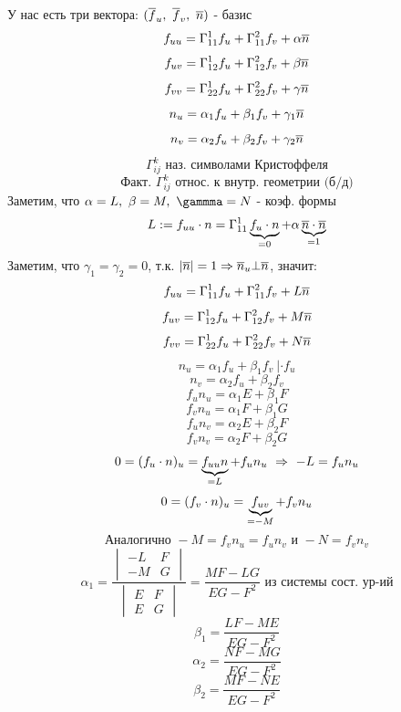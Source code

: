 \documentclass[main]{subfiles}
\begin{document}
    У нас есть три вектора: $(\ol{f}_u,\ \ol{f}_v,\ \ol{n})$ - базис
    \[f_{uu} = \Gamma_{11}^1 f_u + \Gamma_{11}^2 f_v + \alpha \ol{n}\]
    \[f_{uv} = \Gamma_{12}^1 f_u + \Gamma_{12}^2 f_v + \beta \ol{n}\]
    \[f_{vv} = \Gamma_{22}^1 f_u + \Gamma_{22}^2 f_v + \gamma \ol{n}\]
    \[n_u = \alpha_1 f_u + \beta_1 f_v + \gamma_1 \ol{n}\]
    \[n_v = \alpha_2 f_u + \beta_2 f_v + \gamma_2 \ol{n}\]
    \[\Gamma_{ij}^k \text{ наз. символами Кристоффеля}\]
    \[\text{Факт. } \Gamma_{ij}^k \text{ относ. к внутр. геометрии (б/д)}\]
    Заметим, что $\alpha = L,\ \beta = M,\ \gammma = N$ - коэф.  формы
    \[L := f_{uu} \cdot n = \Gamma_{11}^1 \ub{=0}{f_u \cdot n} + \alpha \ub{=1}{\ol{n} \cdot \ol{n}}\]
    Заметим, что $\gamma_1 = \gamma_2 = 0$, т.к. $|\ol{n}| = 1 \Ra \ol{n}_u \bot \ol{n}$, значит:
    \[f_{uu} = \Gamma_{11}^1 f_u + \Gamma_{11}^2 f_v + L \ol{n}\]
    \[f_{uv} = \Gamma_{12}^1 f_u + \Gamma_{12}^2 f_v + M \ol{n}\]
    \[f_{vv} = \Gamma_{22}^1 f_u + \Gamma_{22}^2 f_v + N \ol{n}\]
    \[n_u = \alpha_1 f_u + \beta_1 f_v \ |\cdot f_u\]
    \[n_v = \alpha_2 f_u + \beta_2 f_v \]
    \[f_u n_u = \alpha_1 E + \beta_1 F\]
    \[f_v n_u = \alpha_1 F + \beta_1 G\]
    \[f_u n_v = \alpha_2 E + \beta_2 F\]
    \[f_v n_v = \alpha_2 F + \beta_2 G\]
    \[0 = (f_u \cdot n)_u = \ub{=L}{f_{uu} n} + f_u n_u \RA -L = f_u n_u\]
    \[0 = (f_v \cdot n)_u = \ub{=-M}{f_{uv}} + f_v n_u\]
    \[\text{Аналогично }-M = f_v n_u = f_u n_v \text{ и } -N = f_v n_v\]
    \[\alpha_1 = \frac{\begin{vmatrix}
      -L & F\\
      -M & G
    \end{vmatrix}}{\begin{vmatrix}
      E & F\\
      E & G
    \end{vmatrix}} = \frac{MF - LG}{EG - F^2} \text{ из системы сост. ур-ий}\]
    \[\beta_1 = \frac{LF - ME}{EG - F^2}\]
    \[\alpha_2 = \frac{NF - MG}{EG - F^2}\]
    \[\beta_2 = \frac{MF - NE}{EG - F^2}\]
\end{document}
